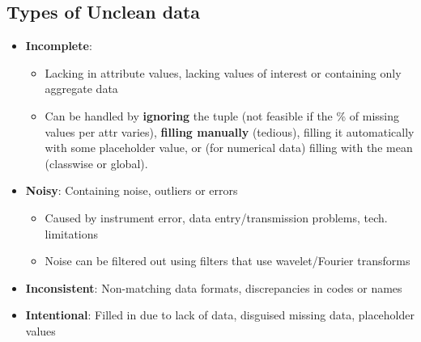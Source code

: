 \documentclass{article}
\theoremstyle{plain}
\theoremstyle{definition}
\begin{document}
\subsection{Types of Unclean data}
\begin{itemize}
    \item \textbf{Incomplete}: 
    \begin{itemize}
        \item Lacking in attribute values, lacking values of interest or containing only aggregate data
        
        \item Can be handled by \textbf{ignoring} the tuple (not feasible if the \% of missing values per attr varies), \textbf{filling manually} (tedious), filling it automatically with some placeholder value, or (for numerical data) filling with the mean (classwise or global). 
    \end{itemize}
    
    \item \textbf{Noisy}: Containing noise, outliers or errors
    \begin{itemize}
        \item Caused by instrument error, data entry/transmission problems, tech. limitations
        
        \item Noise can be filtered out using filters that use wavelet/Fourier transforms
    \end{itemize}
    
    \item \textbf{Inconsistent}: Non-matching data formats, discrepancies in codes or names
    
    \item \textbf{Intentional}: Filled in due to lack of data, disguised missing data, placeholder values
\end{itemize}
\end{document}
